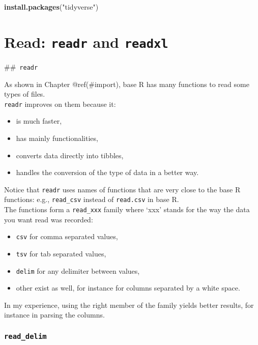 \documentclass[]{book}
\newenvironment{Shaded}{}{}
\newcommand{\KeywordTok}[1]{\textcolor[rgb]{0.00,0.44,0.13}{\textbf{#1}}}
\newcommand{\NormalTok}[1]{#1}
\newcommand{\StringTok}[1]{\textcolor[rgb]{0.25,0.44,0.63}{#1}}
\providecommand{\tightlist}{%
  \setlength{\itemsep}{0pt}\setlength{\parskip}{0pt}}
\theoremstyle{definition}
\theoremstyle{definition}
\theoremstyle{definition}
\theoremstyle{remark}
\begin{document}
\begin{Shaded}
\begin{Highlighting}[]
\KeywordTok{install.packages}\NormalTok{(}\StringTok{"tidyverse"}\NormalTok{)}
\end{Highlighting}
\end{Shaded}

\hypertarget{readr}{%
\chapter{\texorpdfstring{Read: \texttt{readr} and
\texttt{readxl}}{Read: readr and readxl}}\label{readr}}

\#\#~\texttt{readr}

As shown in Chapter @ref(\#import), base R has many functions to read
some types of files.\\
\texttt{readr} improves on them because it:

\begin{itemize}
\tightlist
\item
  is much faster,
\item
  has mainly functionalities,
\item
  converts data directly into tibbles,
\item
  handles the conversion of the type of data in a better way.
\end{itemize}

Notice that \texttt{readr} uses names of functions that are very close
to the base R functions: e.g., \texttt{read\_csv} instead of
\texttt{read.csv} in base R.\\
The functions form a \texttt{read\_xxx} family where `xxx' stands for
the way the data you want read was recorded:

\begin{itemize}
\tightlist
\item
  \texttt{csv} for comma separated values,
\item
  \texttt{tsv} for tab separated values,
\item
  \texttt{delim} for any delimiter between values,
\item
  other exist as well, for instance for columns separated by a white
  space.
\end{itemize}

In my experience, using the right member of the family yields better
results, for instance in parsing the columns.

\hypertarget{read_delim}{%
\subsection{\texorpdfstring{\texttt{read\_delim}}{read\_delim}}\label{read_delim}}
\end{document}
